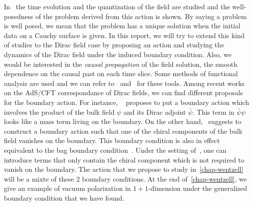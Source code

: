 In~\cite{Zahn2016} the time evolution and the quantization of the field are studied and the well-posedness of the problem derived from this action is shown.
By saying a problem is well posed, we mean that the problem has a unique solution when the initial data on a Cauchy surface is given.
In this report, we will try to extend this kind of studies to the Dirac field case by proposing an action and studying the dynamics of the Dirac field under the induced boundary condition.
Also, we would be interested in the \textit{causal propagation} of the field solution, \ie the smooth dependence on the causal past on each time slice.
Some methods of functional analysis are used and we can refer to~\cite{Reed1981} and~\cite{Reed1975} for these tools. 
%
Among recent works on the AdS/CFT correspondance of Dirac fields, we can find different proposals for the boundary action.
For instance, 
~\cite{Henningson1998} proposes to put a boundary action which involves the product of the bulk field $\psi$ and its Dirac adjoint $\bar{\psi}$. 
This term in $\bar{\psi}\psi$ looks like a mass term living on the boundary.
On the other hand,~\cite{Contino2005} suggests to construct a boundary action such that one of the chiral components of the bulk field vanishes on the boundary.
This boundary condition is also in effect equivalent to the bag boundary condition~\cite{Chodos1974}.
Under the setting of~\cite{Contino2005}, one can introduce terms that only contain the chiral component which is not required to vanish on the boundary.
The action that we propose to study in~\cref{chap-wentzell} will be a mixte of these 2 boundary conditions.
At the end of~\cref{chap-wentzell}, we give an example of vacuum polarization in $1+1$-dimension under the generalized boundary condition that we have found.

